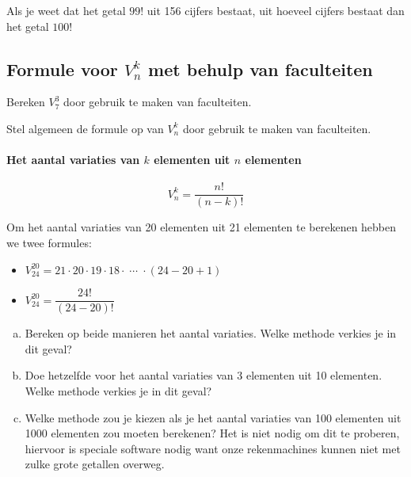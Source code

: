 \documentclass[12pt,twoside]{article}
\begin{document}
\begin{oefening}
Als je weet dat het getal $99!$ uit 156 cijfers bestaat, uit hoeveel cijfers bestaat dan het getal $100!$
\end{oefening}

\begin{theorie}

\pagebreak
\subsection{Formule voor $V^k_n$ met behulp van faculteiten}

Bereken $V^3_7$ door gebruik te maken van faculteiten.

Stel algemeen de formule op van $V^k_n$ door gebruik te maken van faculteiten.

\paragraph*{Het aantal variaties van $k$ elementen uit $n$ elementen}
\begin{mdframed}
$$V^k_n=\dfrac{n!}{(n-k)!}$$
\end{mdframed}

\end{theorie}

\begin{oefening}
Om het aantal variaties van 20 elementen uit 21 elementen te berekenen hebben we twee formules:\\
\begin{itemize}
  \itemsep1em
  \item $\displaystyle V^{20}_{24}=21\cdot20\cdot19\cdot18\cdot\;\cdots\;\cdot(24-20+1)$
  \item $\displaystyle V^{20}_{24}=\dfrac{24!}{(24-20)!}$
\end{itemize}
\begin{enumerate}[(a)]
  \item Bereken op beide manieren het aantal variaties. Welke methode verkies je in dit geval?
  \item Doe hetzelfde voor het aantal variaties van 3 elementen uit 10 elementen. Welke methode verkies je in dit geval?
  \item Welke methode zou je kiezen als je het aantal variaties van 100 elementen uit 1000 elementen zou moeten berekenen? Het is niet nodig om dit te proberen, hiervoor is speciale software nodig want onze rekenmachines kunnen niet met zulke grote getallen overweg.
\end{enumerate}

\end{oefening}
\end{document}
